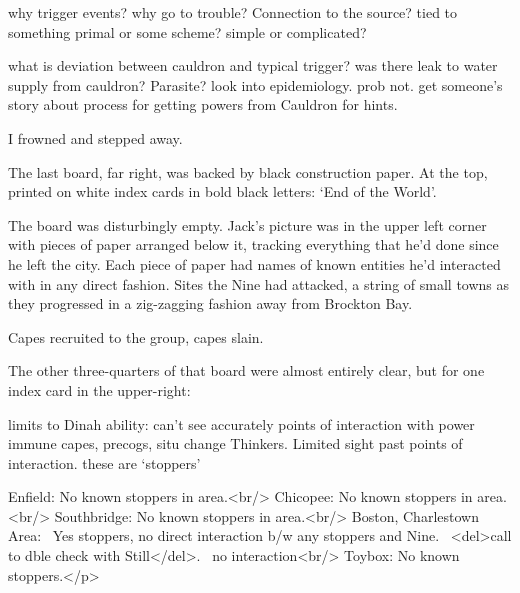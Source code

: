 why trigger events?  why go to trouble?  Connection to the source?  tied to something primal or some scheme?  simple or complicated?



what is deviation between cauldron and typical trigger?  was there leak to water supply from cauldron?  Parasite?  look into epidemiology.  prob not.  get someone's story about process for getting powers from Cauldron for hints.






I frowned and stepped away.



The last board, far right, was backed by black construction paper.  At the top, printed on white index cards in bold black letters: `End of the World'.



The board was disturbingly empty.  Jack's picture was in the upper left corner with pieces of paper arranged below it, tracking everything that he'd done since he left the city.  Each piece of paper had names of known entities he'd interacted with in any direct fashion.  Sites the Nine had attacked, a string of small towns as they progressed in a zig-zagging fashion away from Brockton Bay.



Capes recruited to the group, capes slain.



The other three-quarters of that board were almost entirely clear, but for one index card in the upper-right:



limits to Dinah ability: can't see accurately points of interaction with power immune capes, precogs, situ change Thinkers. Limited sight past points of interaction.  these are `stoppers'



Enfield: No known stoppers in area.<br/>
Chicopee: No known stoppers in area.<br/>
Southbridge: No known stoppers in area.<br/>
Boston, Charlestown Area:  Yes stoppers, no direct interaction b/w any stoppers and Nine.  <del>call to dble check with Still</del>.  no interaction<br/>
Toybox: No known stoppers.</p>



